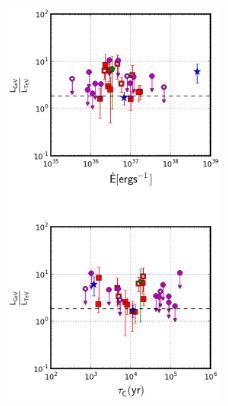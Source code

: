 \begin{figure}[h!]
\centering
\includegraphics[width=0.5\textwidth]{figures/rapport_TeV.eps}

\end{figure}
